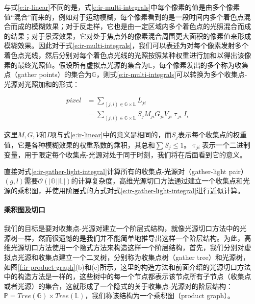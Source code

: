 与式\ref{e:ir-linear}不同的是，式\ref{e:ir-multi-integrals}中每个像素的值是由多个像素值“混合”而来的，例如对于运动模糊，每个像素看到的是一段时间内多个着色点混合而成的模糊效果；对于反走样，它也是由一定区域内多个着色点的光照混合而成的结果；对于景深效果，它对处于焦点外的像素混合周围更大面积的像素值来形成模糊效果。因此对于式\ref{e:ir-multi-integrals}，我们可以表述为对每个像素发射多个着色点光线，然后分别对每个着色点光线的光照按照某种权重进行加和以得出该像素的最终光照值。假设所有虚拟点光源的集合为$\mathds{L}$，每个像素发出的多个称为收集点（gather points）的集合为$\mathds{G}$，则式\ref{e:ir-multi-integrals}可以转换为多个收集点-光源对光照加和的形式：

\begin{equation}\label{e:ir-gather-light-integral}
\begin{aligned}
	pixel&=\sum_{(j,i)\in\mathds{G}\times\mathds{L}}L_{ji}\\
	     &=\sum_{(j,i)\in\mathds{G}\times\mathds{L}}S_jM_{ji}G_{ji}V_{ji}\uptau_{ji}I_i
\end{aligned}
\end{equation}

\noindent 这里$M,G,V$和$I$项与式\ref{e:ir-linear}中的意义是相同的，而$S_j$表示每个收集点的权重值，它是各种模糊效果的权重系数的乘积，其总和$\sum S_j\leq 1$。$\uptau_{ji}$表示一个二进制变量，用于限定每个收集点-光源对处于同于时刻，我们将在后面看到它的意义。

直接对式\ref{e:ir-gather-light-integral}计算所有的收集点-光源对（gather-light pair）$(g,l)$需要$\mathcal{O}(|\mathds{G}||\mathds{L}|)$的计算复杂度，高维光源切口方法通过建立一个收集点和光源的乘积图，并使用阶层式的方式对式\ref{e:ir-gather-light-integral}进行近似计算。




\paragraph{乘积图及切口}
我们的目标是要对收集点-光源对建立一个阶层式结构，就像光源切口方法中的光源树一样，然而很遗憾的是我们并不能简单地推导出这样一个阶层结构。为此，高维光源切口方法使用一个隐式方法来构造这样一个阶层结构，首先，我们分别对虚拟点光源和收集点建立一个二叉树，分别称为收集点树（gather tree）和光源树，如图\ref{f:ir-product-graph}(b)和(c)所示，这里的构造方法和前面介绍的光源切口方法中的构造方法是一样的，这些树中的每一个节点都表示该节点所有子节点（收集点或者光源）的集合，这就形成了一个隐式的关于收集点-光源对的阶层结构：$\mathds{P}=Tree(\mathds{G})\times Tree(\mathds{L})$，我们称该结构为一个乘积图（product graph）。

